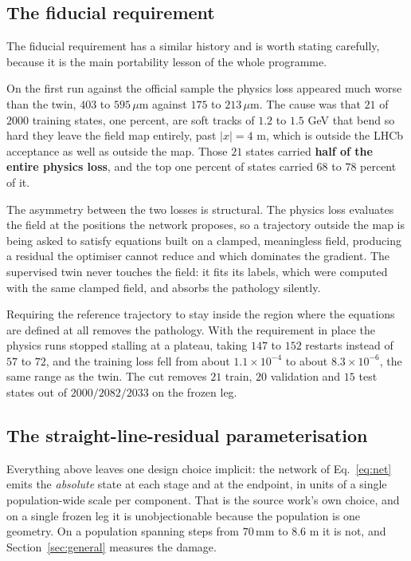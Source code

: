 \documentclass[11pt,a4paper]{article}
\newcommand{\um}{\ensuremath{\,\mu\mathrm{m}}}
\newcommand{\mm}{\ensuremath{\,\mathrm{mm}}}
\begin{document}
\subsection{The fiducial requirement}
\label{sec:fiducial}

The fiducial requirement has a similar history and is worth stating carefully,
because it is the main portability lesson of the whole programme.

On the first run against the official sample the physics loss appeared much
worse than the twin, $403$ to $595\um$ against $175$ to $213\um$. The cause was
that $21$ of $2000$ training states, one percent, are soft tracks of $1.2$ to
$1.5$ GeV that bend so hard they leave the field map entirely, past
$|x| = 4$ m, which is outside the LHCb acceptance as well as outside the map.
Those $21$ states carried \textbf{half of the entire physics loss}, and the top
one percent of states carried $68$ to $78$ percent of it.

The asymmetry between the two losses is structural. The physics loss evaluates
the field at the positions the network proposes, so a trajectory outside the map
is being asked to satisfy equations built on a clamped, meaningless field,
producing a residual the optimiser cannot reduce and which dominates the
gradient. The supervised twin never touches the field: it fits its labels, which
were computed with the same clamped field, and absorbs the pathology silently.

Requiring the reference trajectory to stay inside the region where the equations
are defined at all removes the pathology. With the requirement in place the
physics runs stopped stalling at a plateau, taking $147$ to $152$ restarts
instead of $57$ to $72$, and the training loss fell from about
$1.1 \times 10^{-4}$ to about $8.3 \times 10^{-6}$, the same range as the twin.
The cut removes $21$ train, $20$ validation and $15$ test states out of
$2000/2082/2033$ on the frozen leg.

\subsection{The straight-line-residual parameterisation}
\label{sec:residual-theory}

Everything above leaves one design choice implicit: the network of
Eq.~\eqref{eq:net} emits the \emph{absolute} state at each stage and at the
endpoint, in units of a single population-wide scale per component. That is the
source work's own choice, and on a single frozen leg it is unobjectionable
because the population is one geometry. On a population spanning steps from
$70\mm$ to $8.6$ m it is not, and Section~\ref{sec:general} measures the damage.
\end{document}
